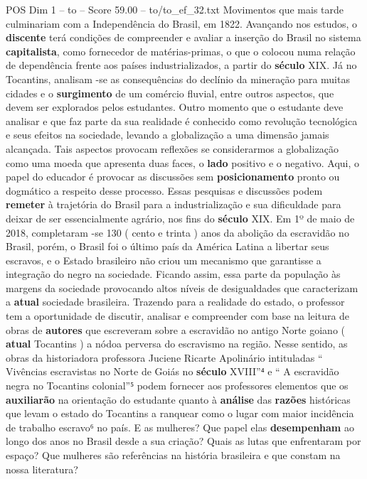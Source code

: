 \begin{textsample}{POS Dim 1 – to – Score 59.00 – to/to\_ef\_32.txt}
Movimentos que mais tarde culminariam com a Independência do Brasil, em 1822.
Avançando nos estudos, o \textbf{discente} terá condições de compreender e avaliar a inserção do Brasil no sistema \textbf{capitalista}, como fornecedor de matérias-primas, o que o colocou numa relação de dependência frente aos países industrializados, a partir do \textbf{século} XIX.
Já no Tocantins, analisam -se as consequências do declínio da mineração para muitas cidades e o \textbf{surgimento} de um comércio fluvial, entre outros aspectos, que devem ser explorados pelos estudantes.
Outro momento que o estudante deve analisar e que faz parte da sua realidade é conhecido como revolução tecnológica e seus efeitos na sociedade, levando a globalização a uma dimensão jamais alcançada.
Tais aspectos provocam reflexões se considerarmos a globalização como uma moeda que apresenta duas faces, o \textbf{lado} positivo e o negativo.
Aqui, o papel do educador é provocar as discussões sem \textbf{posicionamento} pronto ou dogmático a respeito desse processo.
Essas pesquisas e discussões podem \textbf{remeter} à trajetória do Brasil para a industrialização e sua dificuldade para deixar de ser essencialmente agrário, nos fins do \textbf{século} XIX.
Em 1º de maio de 2018, completaram -se 130 ( cento e trinta ) anos da abolição da escravidão no Brasil, porém, o Brasil foi o último país da América Latina a libertar seus escravos, e o Estado brasileiro não criou um mecanismo que garantisse a integração do negro na sociedade.
Ficando assim, essa parte da população às margens da sociedade provocando altos níveis de desigualdades que caracterizam a \textbf{atual} sociedade brasileira.
Trazendo para a realidade do estado, o professor tem a oportunidade de discutir, analisar e compreender com base na leitura de obras de \textbf{autores} que escreveram sobre a escravidão no antigo Norte goiano ( \textbf{atual} Tocantins ) a nódoa perversa do escravismo na região.
Nesse sentido, as obras da historiadora professora Juciene Ricarte Apolinário intituladas “ Vivências escravistas no Norte de Goiás no \textbf{século} XVIII”⁴ e “ A escravidão negra no Tocantins colonial”⁵ podem fornecer aos professores elementos que os \textbf{auxiliarão} na orientação do estudante quanto à \textbf{análise} das \textbf{razões} históricas que levam o estado do Tocantins a ranquear como o lugar com maior incidência de trabalho escravo⁶ no país.
E as mulheres?
Que papel elas \textbf{desempenham} ao longo dos anos no Brasil desde a sua criação?
Quais as lutas que enfrentaram por espaço?
Que mulheres são referências na história brasileira e que constam na nossa literatura?

\end{textsample}

